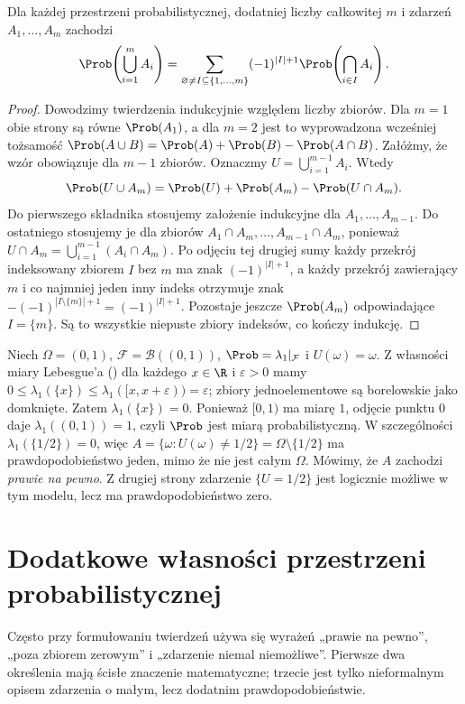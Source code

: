 \begin{stwierdzenie}
Dla każdej przestrzeni probabilistycznej, dodatniej liczby
całkowitej $m$ i zdarzeń $A_1,\ldots,A_m$ zachodzi
\[
\Prob\!\left(\bigcup_{i=1}^m A_i\right)
=\sum_{\varnothing\ne I\subseteq\{1,\ldots,m\}}
(-1)^{|I|+1}\Prob\!\left(\bigcap_{i\in I}A_i\right).
\]
\end{stwierdzenie}
\begin{proof}
Dowodzimy twierdzenia indukcyjnie względem liczby zbiorów.
Dla $m=1$ obie strony są równe $\Prob(A_1)$, a dla $m=2$ jest to
wyprowadzona wcześniej tożsamość
$\Prob(A\cup B)=\Prob(A)+\Prob(B)-\Prob(A\cap B)$.
Załóżmy, że wzór obowiązuje dla $m-1$ zbiorów.
Oznaczmy $U=\bigcup_{i=1}^{m-1}A_i$. Wtedy
\[
\Prob(U\cup A_m)
=\Prob(U)+\Prob(A_m)-\Prob(U\cap A_m).
\]
Do pierwszego składnika stosujemy założenie indukcyjne
dla $A_1,\ldots,A_{m-1}$. Do ostatniego stosujemy
je dla zbiorów $A_1\cap A_m,\ldots,A_{m-1}\cap A_m$,
ponieważ
$U\cap A_m=\bigcup_{i=1}^{m-1}(A_i\cap A_m)$.
Po odjęciu tej drugiej sumy każdy przekrój indeksowany
zbiorem $I$ bez $m$ ma znak $(-1)^{|I|+1}$,
a każdy przekrój zawierający $m$ i co najmniej jeden inny indeks otrzymuje znak
$-(-1)^{|I\setminus\{m\}|+1}=(-1)^{|I|+1}$.
Pozostaje jeszcze $\Prob(A_m)$ odpowiadające $I=\{m\}$.
Są to wszystkie niepuste zbiory indeksów, co kończy indukcję.
\end{proof}


\begin{przyklad}
Niech $\Omega=(0,1)$, $\mathcal F=\mathcal B((0,1))$,
$\Prob=\lambda_1|_{\mathcal F}$ i $U(\omega)=\omega$.
Z własności miary Lebesgue'a
()
dla każdego $x\in\R$ i $\varepsilon>0$ mamy
$0\leq\lambda_1(\{x\})\leq\lambda_1([x,x+\varepsilon))=\varepsilon$;
zbiory jednoelementowe są borelowskie jako domknięte.
Zatem $\lambda_1(\{x\})=0$. Ponieważ $[0,1)$ ma miarę $1$,
odjęcie punktu $0$ daje $\lambda_1((0,1))=1$,
czyli $\Prob$ jest miarą probabilistyczną. W szczególności
$\lambda_1(\{1/2\})=0$, więc
$A=\{\omega:U(\omega)\neq1/2\}=\Omega\setminus\{1/2\}$
ma prawdopodobieństwo jeden, mimo że nie jest całym $\Omega$. Mówimy, że $A$ zachodzi
\emph{prawie na pewno}. Z drugiej strony zdarzenie
$\{U=1/2\}$ jest logicznie możliwe w tym modelu,
lecz ma prawdopodobieństwo zero.
\end{przyklad}


\section{Dodatkowe własności przestrzeni probabilistycznej}
Często przy formułowaniu twierdzeń używa się wyrażeń
„prawie na pewno”, „poza zbiorem zerowym” i „zdarzenie
niemal niemożliwe”. Pierwsze dwa określenia mają ścisłe
znaczenie matematyczne; trzecie jest tylko nieformalnym
opisem zdarzenia o małym, lecz dodatnim prawdopodobieństwie.

